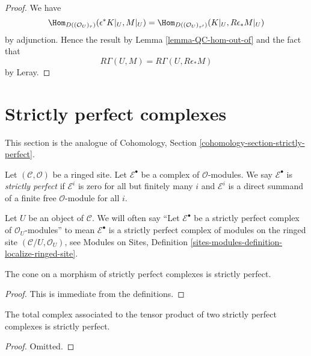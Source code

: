 \begin{proof}
We have
$$
\Hom_{D((\mathcal{O}_U)_\tau)}(\epsilon^*K|_U, M|_U) =
\Hom_{D((\mathcal{O}_U)_{\tau'})}(K|_U, R\epsilon_*M|_U)
$$
by adjunction. Hence the result by Lemma \ref{lemma-QC-hom-out-of}
and the fact that
$$
R\Gamma(U, M) = R\Gamma(U, R\epsilon_*M)
$$
by Leray.
\end{proof}







\section{Strictly perfect complexes}
\label{section-strictly-perfect}

\noindent
This section is the analogue of
Cohomology, Section \ref{cohomology-section-strictly-perfect}.

\begin{definition}
\label{definition-strictly-perfect}
Let $(\mathcal{C}, \mathcal{O})$ be a ringed site.
Let $\mathcal{E}^\bullet$ be a complex of $\mathcal{O}$-modules.
We say $\mathcal{E}^\bullet$ is {\it strictly perfect}
if $\mathcal{E}^i$ is zero for all but finitely many $i$ and
$\mathcal{E}^i$ is a direct summand of a finite free
$\mathcal{O}$-module for all $i$.
\end{definition}

\noindent
Let $U$ be an object of $\mathcal{C}$. We will often say
``Let $\mathcal{E}^\bullet$ be a strictly perfect complex of
$\mathcal{O}_U$-modules'' to mean $\mathcal{E}^\bullet$ is a strictly perfect
complex of modules on the ringed site $(\mathcal{C}/U, \mathcal{O}_U)$, see
Modules on Sites, Definition
\ref{sites-modules-definition-localize-ringed-site}.

\begin{lemma}
\label{lemma-cone}
The cone on a morphism of strictly perfect complexes is
strictly perfect.
\end{lemma}

\begin{proof}
This is immediate from the definitions.
\end{proof}

\begin{lemma}
\label{lemma-tensor}
The total complex associated to the tensor product of two
strictly perfect complexes is strictly perfect.
\end{lemma}

\begin{proof}
Omitted.
\end{proof}

